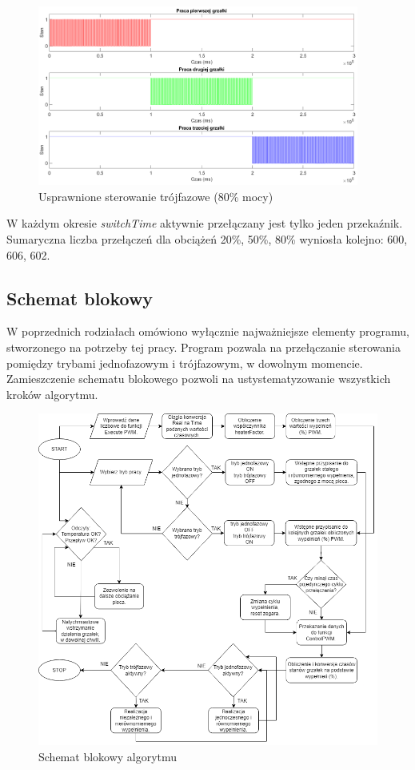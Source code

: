 \documentclass[a4paper,twoside,12pt]{book}
\begin{document}
\newpage
\begin{figure}[h]
	\centering
	\includegraphics[width=0.94\textwidth]{./wykresy/png/threePhase80better.png}
	\caption{Usprawnione sterowanie trójfazowe (80\% mocy)}
	\label{fig:ThreePhase80better}
\end{figure}

\noindent W każdym okresie \textit{switchTime} aktywnie przełączany jest tylko jeden przekaźnik. Sumaryczna liczba przełączeń dla obciążeń 20\%, 50\%, 80\% wyniosła kolejno: 600, 606, 602.

\newpage

\subsection{Schemat blokowy}
W poprzednich rodziałach omówiono wyłącznie najważniejsze elementy programu, stworzonego na potrzeby tej pracy. Program pozwala na przełączanie sterowania pomiędzy trybami jednofazowym i trójfazowym, w dowolnym momencie. Zamieszczenie schematu blokowego pozwoli na ustystematyzowanie wszystkich kroków algorytmu.

\begin{figure}[h]
	\centering
	\includegraphics[width=1\textwidth]{./img/algorithm.png}
	\caption{Schemat blokowy algorytmu}
	\label{fig:Schemat blokowy}
\end{figure}
\end{document}
